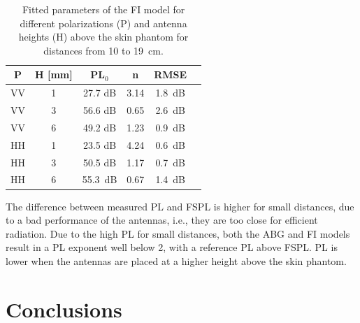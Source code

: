 \documentclass[preprint]{rsl}
\begin{document}
\begin{table}[tb]
  \caption{Fitted parameters of the FI model for different polarizations (P) and antenna heights (H) above the skin phantom for distances from 10 to 19~cm.}
  \label{table:FI}
  \begin{center}
    \begin{tabular}{cc|cccc}
      P & H [mm] & PL$_0$ & n& RMSE \\
      \hline
      VV & 1 & 27.7 dB & 3.14 & 1.8~dB \\
      VV & 3 & 56.6 dB & 0.65 & 2.6~dB \\
      VV & 6 & 49.2 dB & 1.23 & 0.9~dB \\
      HH & 1 & 23.5 dB & 4.24 & 0.6~dB \\
      HH & 3 & 50.5 dB & 1.17 & 0.7~dB \\
      HH & 6 & 55.3~dB & 0.67 & 1.4~dB \\
    \end{tabular}
  \end{center}
\end{table}

The difference between measured PL and FSPL is higher for small distances, due to a bad performance of the antennas, i.e., they are too close for efficient radiation. 
Due to the high PL for small distances, both the ABG and FI models result in a PL exponent well below 2, with a reference PL above FSPL. 
PL is lower when the antennas are placed at a higher height above the skin phantom. 

\section{Conclusions\label{sect:conclusion}}
\end{document}
